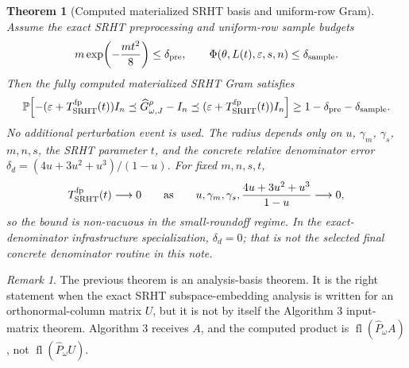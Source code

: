 \documentclass[11pt]{article}
\newcommand{\Prob}{\mathbb{P}}
\newcommand{\fl}{\operatorname{fl}}
\newcommand{\I}{I}
\newcommand{\eps}{\varepsilon}
\newtheorem{theorem}{Theorem}
\theoremstyle{remark}
\newtheorem*{remark}{Remark}
\begin{document}
\begin{theorem}[Computed materialized SRHT basis and uniform-row Gram]
Assume the exact SRHT preprocessing and uniform-row sample budgets
\[
  m\exp\!\left(-\frac{mt^2}{8}\right)\le\delta_{\rm pre},
  \qquad
  \Phi(\theta,L(t),\eps,s,n)\le\delta_{\rm sample}.
\]
Then the fully computed materialized SRHT Gram satisfies
\[
  \Prob\!\left[
    -(\eps+T_{\rm SRHT}^{\rm fp}(t))\I_n
    \preceq
    \widehat G_{\omega,J}^\rho-\I_n
    \preceq
    (\eps+T_{\rm SRHT}^{\rm fp}(t))\I_n
  \right]
  \ge
  1-\delta_{\rm pre}-\delta_{\rm sample}.
\]
No additional perturbation event is used.  The radius depends only on \(u\),
\(\gamma_m\), \(\gamma_s\), \(m,n,s\), the SRHT parameter \(t\), and the
concrete relative denominator error
\(\delta_d=(4u+3u^2+u^3)/(1-u)\).  For fixed \(m,n,s,t\),
\[
  T_{\rm SRHT}^{\rm fp}(t)\longrightarrow 0
  \qquad
  \text{as}\qquad
  u,\gamma_m,\gamma_s,\frac{4u+3u^2+u^3}{1-u}\longrightarrow 0,
\]
so the bound is non-vacuous in the small-roundoff regime.  In the
exact-denominator infrastructure specialization, \(\delta_d=0\); that is not
the selected final concrete denominator routine in this note.
\end{theorem}

\begin{remark}
The previous theorem is an analysis-basis theorem.  It is the right statement
when the exact SRHT subspace-embedding analysis is written for an
orthonormal-column matrix \(U\), but it is not by itself the Algorithm 3
input-matrix theorem.  Algorithm 3 receives \(A\), and the computed product is
\(\fl(\widehat P_\omega A)\), not \(\fl(\widehat P_\omega U)\).
\end{remark}
\end{document}
